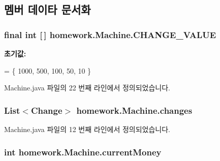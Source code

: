 \subsection{멤버 데이타 문서화}
\subsubsection[{\texorpdfstring{C\+H\+A\+N\+G\+E\+\_\+\+V\+A\+L\+UE}{CHANGE_VALUE}}]{\setlength{\rightskip}{0pt plus 5cm}final int \mbox{[}$\,$\mbox{]} homework.\+Machine.\+C\+H\+A\+N\+G\+E\+\_\+\+V\+A\+L\+UE\hspace{0.3cm}{\ttfamily [static]}}\hypertarget{classhomework_1_1_machine_ab52b84064804f444c66656c109a17ce0}{}\label{classhomework_1_1_machine_ab52b84064804f444c66656c109a17ce0}
{\bfseries 초기값\+:}
\begin{DoxyCode}
= \{
            1000, 500, 100, 50, 10
            \}
\end{DoxyCode}


Machine.\+java 파일의 22 번째 라인에서 정의되었습니다.

\subsubsection[{\texorpdfstring{changes}{changes}}]{\setlength{\rightskip}{0pt plus 5cm}List$<${\bf Change}$>$ homework.\+Machine.\+changes\hspace{0.3cm}{\ttfamily [private]}}\hypertarget{classhomework_1_1_machine_a48e377022719ab86eb778519dfc46a32}{}\label{classhomework_1_1_machine_a48e377022719ab86eb778519dfc46a32}


Machine.\+java 파일의 12 번째 라인에서 정의되었습니다.

\subsubsection[{\texorpdfstring{current\+Money}{currentMoney}}]{\setlength{\rightskip}{0pt plus 5cm}int homework.\+Machine.\+current\+Money\hspace{0.3cm}{\ttfamily [private]}}\hypertarget{classhomework_1_1_machine_a79f249f2701117b1e20977785536dad1}{}\label{classhomework_1_1_machine_a79f249f2701117b1e20977785536dad1}



